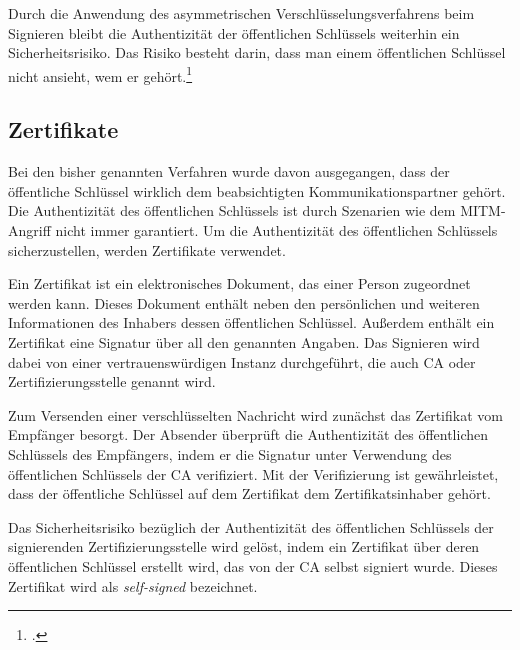 \documentclass  [paper=a4,
				fontsize=12pt,
				listof=totoc,
				bibliography=totoc
				]{scrreprt}
\begin{document}
				Durch die Anwendung des asymmetrischen Verschlüsselungsverfahrens beim Signieren bleibt die Authentizität der öffentlichen Schlüssels weiterhin ein Sicherheitsrisiko. Das Risiko besteht darin, dass	\glqq man einem öffentlichen Schlüssel nicht ansieht, wem er gehört\grqq{}.\footcite[][S. 506]{Schmeh2013}
	
			\subsection{Zertifikate}\label{chap:ertifikate}
				Bei den bisher genannten Verfahren wurde davon ausgegangen, dass der öffentliche Schlüssel wirklich dem beabsichtigten Kommunikationspartner gehört. Die Authentizität des öffentlichen Schlüssels ist durch Szenarien wie dem \ac{MITM}-Angriff nicht immer garantiert. Um die Authentizität des öffentlichen Schlüssels sicherzustellen, werden Zertifikate verwendet.
				
				Ein Zertifikat ist ein elektronisches Dokument, das einer Person zugeordnet werden kann. Dieses Dokument enthält neben den persönlichen und weiteren Informationen des Inhabers dessen öffentlichen Schlüssel. Außerdem enthält ein Zertifikat eine Signatur über all den genannten Angaben. Das Signieren wird dabei von einer vertrauenswürdigen Instanz durchgeführt, die auch \ac{CA} oder Zertifizierungsstelle genannt wird.
				
				Zum Versenden einer verschlüsselten Nachricht wird zunächst das Zertifikat vom Empfänger besorgt. Der Absender überprüft die Authentizität des öffentlichen Schlüssels des Empfängers, indem er die Signatur unter Verwendung des öffentlichen Schlüssels der \ac{CA} verifiziert. Mit der Verifizierung ist gewährleistet, dass der öffentliche Schlüssel auf dem Zertifikat dem Zertifikatsinhaber gehört.
				
				Das Sicherheitsrisiko bezüglich der Authentizität des öffentlichen Schlüssels der signierenden Zertifizierungsstelle wird gelöst, indem ein Zertifikat über deren öffentlichen Schlüssel erstellt wird, das von der \ac{CA} selbst signiert wurde. Dieses Zertifikat wird als \textit{self-signed} bezeichnet.
	
\end{document}

